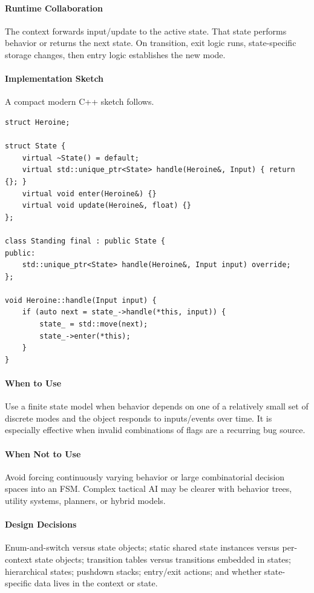 \documentclass[11pt]{article}
\begin{document}
\paragraph{Runtime Collaboration} The context forwards input/update to the active state. That state performs behavior or returns the next state. On transition, exit logic runs, state-specific storage changes, then entry logic establishes the new mode.
\paragraph{Implementation Sketch} A compact modern C++ sketch follows.
\begin{lstlisting}
struct Heroine;

struct State {
    virtual ~State() = default;
    virtual std::unique_ptr<State> handle(Heroine&, Input) { return {}; }
    virtual void enter(Heroine&) {}
    virtual void update(Heroine&, float) {}
};

class Standing final : public State {
public:
    std::unique_ptr<State> handle(Heroine&, Input input) override;
};

void Heroine::handle(Input input) {
    if (auto next = state_->handle(*this, input)) {
        state_ = std::move(next);
        state_->enter(*this);
    }
}
\end{lstlisting}
\paragraph{When to Use} Use a finite state model when behavior depends on one of a relatively small set of discrete modes and the object responds to inputs/events over time. It is especially effective when invalid combinations of flags are a recurring bug source.
\paragraph{When Not to Use} Avoid forcing continuously varying behavior or large combinatorial decision spaces into an FSM. Complex tactical AI may be clearer with behavior trees, utility systems, planners, or hybrid models.
\paragraph{Design Decisions} Enum-and-switch versus state objects; static shared state instances versus per-context state objects; transition tables versus transitions embedded in states; hierarchical states; pushdown stacks; entry/exit actions; and whether state-specific data lives in the context or state.
\end{document}
